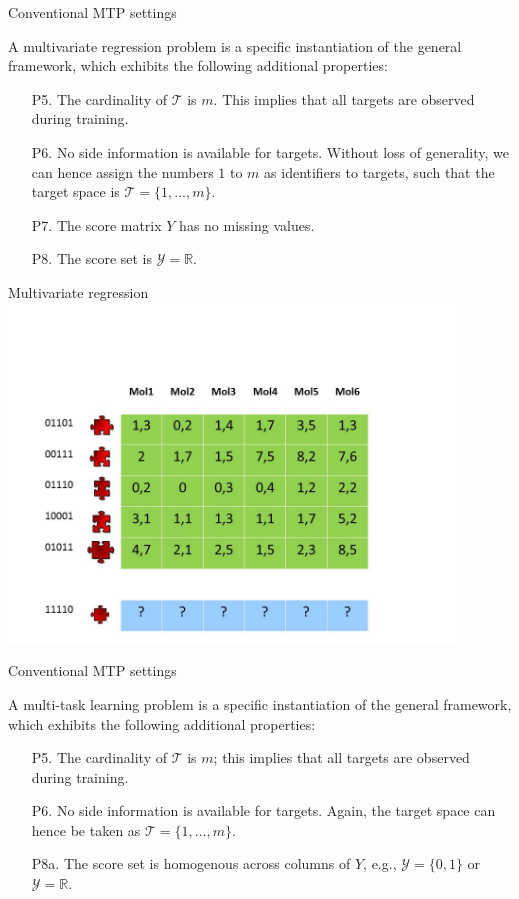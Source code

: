 \documentclass[]{beamer}
\begin{document}
\begin{frame}{Conventional MTP settings}
\begin{definition} 
A multivariate regression problem is a specific instantiation of the general framework, which exhibits the following additional properties: 
\begin{enumerate}
\item[P5.] The cardinality of $\mathcal{T}$ is $m$. This implies that all targets are observed during training. 
\item[P6.] No side information is available for targets. Without loss of generality, we can hence assign the numbers $1$ to $m$ as identifiers to targets, such that the target space is $\mathcal{T} = \{1,...,m\}$. 
\item[P7.] The score matrix $Y$ has no missing values. 
\item[P8.] The score set is $\mathcal{Y} = \mathbb{R}$. 
\end{enumerate}
\end{definition}
\end{frame}

\begin{frame}{Multivariate regression}
\includegraphics[width=0.9\textwidth,trim = 0 0 100 100,clip]{Figures/pictures/Slide1}
\end{frame}

\begin{frame}{Conventional MTP settings}
\begin{definition} 
A multi-task learning problem is a specific instantiation of the general framework, which exhibits the following additional properties: 
\begin{enumerate}
\item[P5.] The cardinality of $\mathcal{T}$ is $m$; this implies that all targets are observed during training. 
\item[P6.] No side information is available for targets. Again, the target space can hence be taken as $\mathcal{T} = \{1,...,m\}$.   
\item[P8a.] The score set is homogenous across columns of $Y$, e.g., $\mathcal{Y} = \{0,1\}$ or $\mathcal{Y} = \mathbb{R}$.
\end{enumerate}
\end{definition}
\end{frame}
\end{document}
